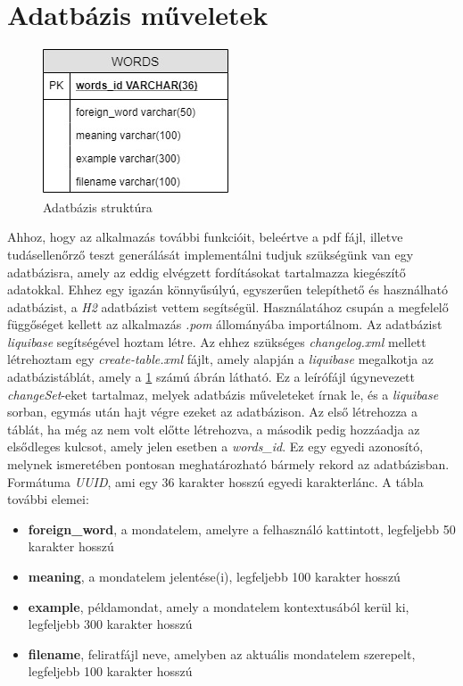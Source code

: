 \section{Adatbázis műveletek}

\begin{figure}
  \includegraphics[width=.5\linewidth]{images/entity.jpg}
  \centering
  \caption{Adatbázis struktúra}
  \label{fig:entity}
\end{figure}

Ahhoz, hogy az alkalmazás további funkcióit, beleértve a pdf fájl, illetve tudásellenőrző teszt generálását implementálni tudjuk szükségünk van egy adatbázisra, amely az eddig elvégzett fordításokat tartalmazza kiegészítő adatokkal. Ehhez egy igazán könnyűsúlyú, egyszerűen telepíthető és használható adatbázist, a \textit{H2} adatbázist vettem segítségül. Használatához csupán a megfelelő függőséget kellett az alkalmazás \textit{.pom} állományába importálnom. Az adatbázist \textit{liquibase} segítségével hoztam létre. Az ehhez szükséges \textit{changelog.xml} mellett létrehoztam egy \textit{create-table.xml} fájlt, amely alapján a \textit{liquibase} megalkotja az adatbázistáblát, amely a \ref{fig:entity} számú ábrán látható. Ez a leírófájl 
úgynevezett \textit{changeSet}-eket tartalmaz, melyek adatbázis műveleteket írnak le, és a \textit{liquibase} sorban, egymás után hajt végre ezeket az adatbázison. Az első létrehozza a táblát, ha még az nem volt előtte létrehozva, a második pedig hozzáadja az elsődleges kulcsot, amely jelen esetben a \textit{words\_id}. Ez egy egyedi azonosító, melynek ismeretében pontosan meghatározható bármely rekord az adatbázisban. Formátuma \textit{UUID}, ami egy 36 karakter hosszú egyedi karakterlánc. A tábla további elemei:
\begin{itemize}
\item \textbf{ foreign\_word}, a mondatelem, amelyre a felhasználó kattintott, legfeljebb 50 karakter hosszú
\item \textbf{meaning}, a mondatelem jelentése(i), legfeljebb 100 karakter hosszú
\item \textbf{example}, példamondat, amely a mondatelem kontextusából kerül ki, legfeljebb 300 karakter hosszú
\item \textbf{filename}, feliratfájl neve, amelyben az aktuális mondatelem szerepelt, legfeljebb 100 karakter hosszú
\end{itemize}


